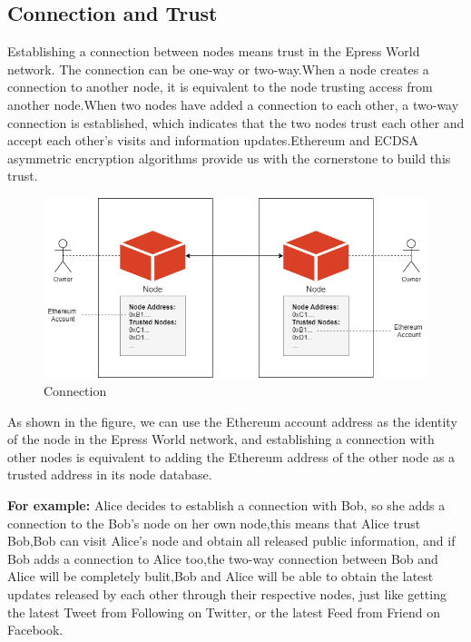 \documentclass{article}
\begin{document}
\subsection{Connection and Trust}
    Establishing a connection between nodes means trust in the Epress World network. The connection can be one-way or two-way.When a node creates a connection to another node, it is equivalent to the node trusting access from another node.When two nodes have added a connection to each other, a two-way connection is established, which indicates that the two nodes trust each other and accept each other's visits and information updates.Ethereum and ECDSA asymmetric encryption algorithms provide us with the cornerstone to build this trust.

    \begin{figure}[H]
        \centering
        \includegraphics[width=\textwidth]{figures-connect.png}
        \caption{Connection}
    \end{figure}

    As shown in the figure, we can use the Ethereum account address as the identity of the node in the Epress World network, and establishing a connection with other nodes is equivalent to adding the Ethereum address of the other node as a trusted address in its node database.
    ~\newline
    \begin{blockqt}
    \textbf{For example: }Alice decides to establish a connection with Bob, so she adds a connection to the Bob's node on her own node,this means that Alice trust Bob,Bob can visit Alice's node and obtain all released public information, and if Bob adds a connection to Alice too,the two-way connection between Bob and Alice will be completely bulit,Bob and Alice will be able to obtain the latest updates released by each other through their respective nodes, just like getting the latest Tweet from Following on Twitter, or the latest Feed from Friend on Facebook.
    \end{blockqt}
\end{document}
